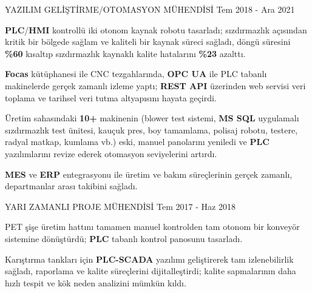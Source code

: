 \begin{cventries}
  \cventry
    {YAZILIM GELİŞTİRME/OTOMASYON MÜHENDİSİ} %
    {} %
    {} %
    {Tem 2018 - Ara 2021} %
    {
      \begin{cvitems} %
        \item {\textbf{PLC}/\textbf{HMI} kontrollü iki otonom kaynak robotu tasarladı; sızdırmazlık açısından kritik bir bölgede sağlam ve kaliteli bir kaynak süreci sağladı, döngü süresini \textbf{\%60} kısaltıp sızdırmazlık kaynaklı kalite hatalarını \textbf{\%23} azalttı.}
        \item {\textbf{Focas} kütüphanesi ile CNC tezgahlarında, \textbf{OPC UA} ile PLC tabanlı makinelerde gerçek zamanlı izleme yaptı; \textbf{REST API} üzerinden web servisi veri toplama ve tarihsel veri tutma altyapısını hayata geçirdi.}
        \item {Üretim sahasındaki \textbf{10+} makinenin (blower test sistemi, \textbf{MS SQL} uygulamalı sızdırmazlık test ünitesi, kauçuk pres, boy tamamlama, polisaj robotu, testere, radyal matkap, kumlama vb.) eski, manuel panolarını yeniledi ve \textbf{PLC} yazılımlarını revize ederek otomasyon seviyelerini artırdı.}
        \item {\textbf{MES} ve \textbf{ERP} entegrasyonu ile üretim ve bakım süreçlerinin gerçek zamanlı, departmanlar arası takibini sağladı.}
      \end{cvitems}
    }

\end{cventries}

\vspace{-3mm}

\begin{cventries}

  \cventry
    {YARI ZAMANLI PROJE MÜHENDİSİ} %
    {} %
    {} %
    {Tem 2017 - Haz 2018 } %
    {
      \begin{cvitems} %
        \item {PET şişe üretim hattını tamamen manuel kontrolden tam otonom bir konveyör sistemine dönüştürdü; \textbf{PLC} tabanlı kontrol panosunu tasarladı.}
        \item {Karıştırma tankları için \textbf{PLC-SCADA} yazılımı geliştirerek tam izlenebilirlik sağladı, raporlama ve kalite süreçlerini dijitalleştirdi; kalite sapmalarının daha hızlı tespit ve kök neden analizini mümkün kıldı.}
      \end{cvitems}
    }
    \vspace{1mm}

\end{cventries}
